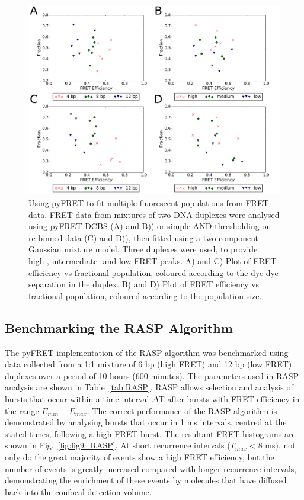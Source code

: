 \begin{figure}[!ht]
   \begin{center}
      \includegraphics*[clip=true, width=6in]{pyFRET/ratios_FRET.pdf}
      \caption{Using pyFRET to fit multiple fluorescent populations from FRET data. FRET data from mixtures of two DNA duplexes were analysed using pyFRET DCBS (A) and B)) or simple AND thresholding on re-binned data (C) and D)), then fitted using a two-component Gaussian mixture model. Three duplexes were used, to provide high-, intermediate- and low-FRET peaks. A) and C) Plot of FRET efficiency vs fractional population, coloured according to the dye-dye separation in the duplex. B) and D) Plot of FRET efficiency vs fractional population, coloured according to the population size.}
      \label{fig:ratios_FRET}
   \end{center}
\end{figure}

\clearpage

\subsection{Benchmarking the RASP Algorithm}    
The pyFRET implementation of the RASP algorithm was benchmarked using data collected from a 1:1 mixture of 6 bp (high FRET) and 12 bp (low FRET) duplexes over a period of 10 hours (600 minutes). The parameters used in RASP analysis are shown in Table~\ref{tab:RASP}. RASP allows selection and analysis of bursts that occur within a time interval $\Delta$T after bursts with FRET efficiency in the range $E_{min} - E_{max}$. The correct performance of the RASP algorithm is demonstrated by analysing bursts that occur in 1 ms intervals, centred at the stated times, following a high FRET burst. The resultant FRET histograms are shown in Fig.~\ref{fig:fig9_RASP}. At short recurrence intervals ($T_{max} < 8$ ms), not only do the great majority of events show a high FRET efficiency, but the number of events is greatly increased compared with longer recurrence intervals, demonstrating the enrichment of these events by molecules that have diffused back into the confocal detection volume. 



